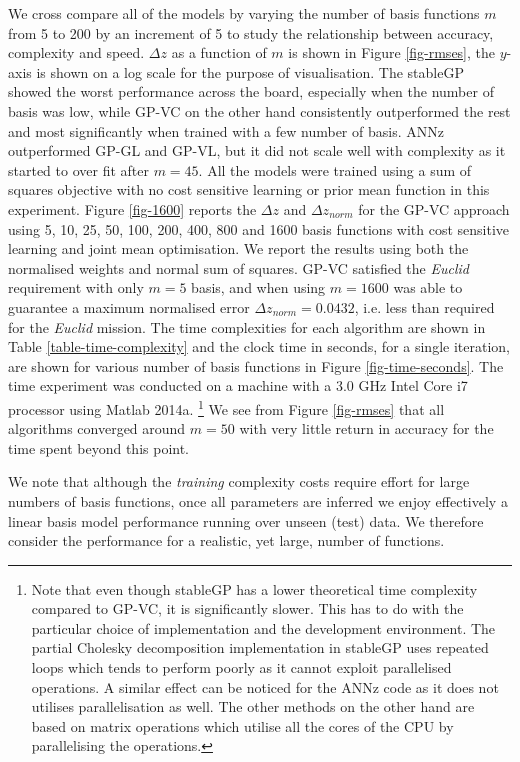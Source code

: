 \documentclass[useAMS,usenatbib,fleqn]{mn2e}
\begin{document}
We cross compare all of the models by varying the number of basis functions $m$ from 5 to 200 by an increment of 5 to study the relationship between accuracy, complexity and speed. $\Delta z$ as a function of $m$ is shown in Figure \ref{fig-rmses}, the $y$-axis is shown on a log scale for the purpose of visualisation. The stableGP showed the worst performance across the board, especially when the number of basis was low, while GP-VC on the other hand consistently outperformed the rest and most significantly when trained with a few number of basis. ANNz outperformed GP-GL and GP-VL, but it did not scale well with complexity as it started to over fit after $m=45$. All the models were trained using a sum of squares objective with no cost sensitive learning or prior mean function in this experiment. Figure \ref{fig-1600} reports the $\Delta z$ and $\Delta z_{norm}$ for the GP-VC approach using 5, 10, 25, 50, 100, 200, 400, 800 and 1600 basis functions with cost sensitive learning and joint mean optimisation. We report the results using both the normalised weights and normal sum of squares. GP-VC satisfied the {\em Euclid} requirement with only $m=5$ basis, and when using $m=1600$ was able to guarantee  a maximum normalised error $\Delta z_{norm} = 0.0432$, i.e. less than required for the {\em Euclid} mission. The  time complexities for each algorithm are shown in Table \ref{table-time-complexity} and the clock time in seconds, for a single iteration, are shown for various number of basis functions in Figure \ref{fig-time-seconds}. The time experiment was conducted on a machine with a 3.0 GHz Intel Core i7 processor using Matlab 2014a. \footnote{Note that even though stableGP has a lower theoretical time complexity compared to GP-VC, it is significantly slower. This has to do with the particular choice of implementation and the development environment. The partial Cholesky decomposition implementation in stableGP \citep{stableGP} uses repeated loops which tends to perform poorly as it cannot exploit parallelised operations. A similar effect can be noticed for the ANNz code as it does not utilises parallelisation as well. The other methods on the other hand are based on matrix operations which utilise all the cores of the CPU by parallelising the operations.} We see from Figure \ref{fig-rmses} that all algorithms converged around $m=50$ with very little return in accuracy for the time spent beyond this point.

We note that although the \emph{training} complexity costs require effort for large numbers of basis functions, once all parameters are inferred we enjoy effectively a linear basis model performance running over unseen (test) data. We therefore consider the performance for a realistic, yet large, number of functions. 
\end{document}
